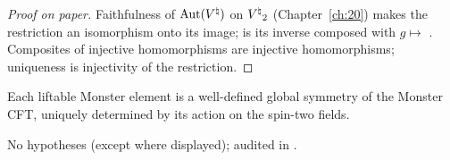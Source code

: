 \begin{proof}[Proof on paper]
Faithfulness of $\operatorname{Aut}({V^{\natural}})$ on ${V^{\natural}}_2$ (Chapter~\ref{ch:20}) makes the restriction an isomorphism onto
its image;  is its inverse composed with $g\mapsto$ .  Composites of
injective homomorphisms are injective homomorphisms; uniqueness is injectivity of the restriction.
\end{proof}
\begin{physics}
Each liftable Monster element is a well-defined global symmetry of the Monster CFT, uniquely
determined by its action on the spin-two fields.
\end{physics}
\begin{status}
No hypotheses (except  where displayed); audited in
.
\end{status}


